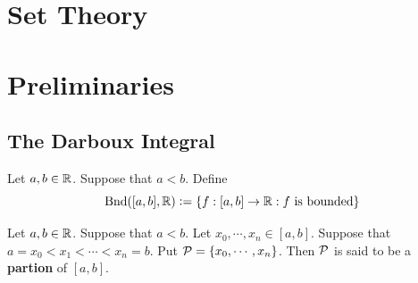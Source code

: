 \documentclass{book}
\begin{document}
	
	
	
	
	
	
	
	
	
	
	
	
	
	
	\chapter{Set Theory}
	
	
	
	
	
	
	
	
	
	
	
	
	
	
	
	
	
	
	
	
	
	
	
	
	
	
	
	
	
	
	
	
	
	
	
	
	
	
	
	
	
	
	
	\newpage
	\chapter{Preliminaries}
	
	\section{The Darboux Integral}
	
	\begin{defn}  
		Let $a,b \in \mathbb{R}$. Suppose that $a<b$. Define $$\text{Bnd}([a,b], \mathbb{R}) \vcentcolon= \{f:[a,b] \rightarrow \mathbb{R}: f\text{ is bounded}\}$$
	\end{defn}
	
	\begin{defn}  
		Let $a,b \in \mathbb{R}$. Suppose that $a<b$. Let $x_0, \cdots, x_n \in [a,b]$. Suppose that $a= x_0 < x_1 < \cdots < x_n = b$. Put $\mathcal{P} = \{x_0, \cdots, x_n\}$. Then $\mathcal{P}$ is said to be a \textbf{partion} of $[a,b]$. 
	\end{defn}
	
\end{document}
